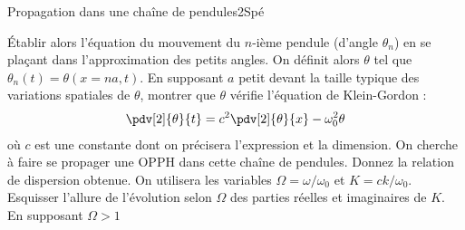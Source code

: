 \begin{exercise}{Propagation dans une chaîne de pendules}{2}{Spé}
\begin{questions}
\begin{center}
\begin{tikzpicture}
    \end{tikzpicture}
    \end{center}
    Établir alors l'équation du mouvement du $n$-ième pendule (d'angle $\theta_n$) en se plaçant dans l'approximation des petits angles.
    \question On définit alors $\theta$ tel que $\theta_n(t) = \theta(x = na, t)$. En supposant $a$ petit devant la taille typique des variations spatiales de $\theta$, montrer que $\theta$ vérifie l'équation de Klein-Gordon :
    \begin{align*}
        \pdv[2]{\theta}{t} = c^2 \pdv[2]{\theta}{x} - \omega_0^2\theta
    \end{align*}
    où $c$ est une constante dont on précisera l'expression et la dimension.
    \question On cherche à faire se propager une OPPH dans cette chaîne de pendules. Donnez la relation de dispersion obtenue. On utilisera les variables $\Omega = \omega / \omega_0$ et $K = c k / \omega_0$.
    \question Esquisser l'allure de l'évolution selon $\Omega$ des parties réelles et imaginaires de $K$.
    \question En supposant $\Omega > 1$
\end{questions}

\end{exercise}